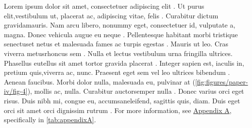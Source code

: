\begin{sloppypar} %

Lorem  ipsum dolor sit amet, consectetuer adipiscing elit \cite{LIUDIMULYO201767}. Ut purus  elit,vestibulum ut, placerat ac, adipiscing vitae, felis . Curabitur dictum  gravidamauris. Nam arcu libero, nonummy eget, consectetuer id, vulputate a, magna. Donec vehicula augue eu neque \cite{liudimulyo_2018}. Pellentesque habitant morbi tristique senectuset netus et malesuada fames ac turpis egestas . Mauris ut leo. Cras viverra metusrhoncus sem \cite{2019liudimulyo}. Nulla et lectus vestibulum urna fringilla ultrices. Phasellus eutellus sit amet tortor gravida placerat . Integer sapien est, iaculis in, pretium quis,viverra ac, nunc. Praesent eget sem vel leo ultrices bibendum \cite{liudimulyo2020853}. Aenean faucibus. Morbi dolor nulla, malesuada eu, pulvinar at (\ref{fig:figures/paper-iv/fig-4}), mollis ac, nulla. Curabitur auctorsemper nulla . Donec varius orci eget risus. Duis nibh mi, congue eu, accumsaneleifend, sagittis quis, diam. Duis eget orci sit amet orci dignissim rutrum \cite{LIUDIMULYO201767,liudimulyo_2018,2019liudimulyo,liudimulyo2020853,liudimulyo_unpublished1,liudimulyo_unpublished2}. For more information, see \hyperref[appendix:A]{Appendix A}, specifically in \ref{tab:appendixA}.

\end{sloppypar}

